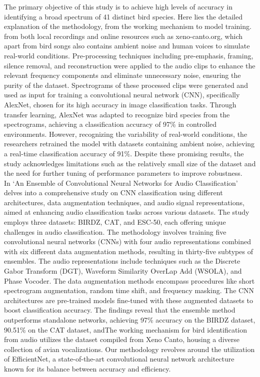 The primary objective of this study is to achieve high levels of accuracy in identifying a broad spectrum of 41 distinct bird species. 
Here lies the detailed explanation of the methodology, from the working mechanism to model training.
from both local recordings and
online resources such as xeno-canto.org, which apart from bird songs also
contains ambient noise and
human voices to simulate real-world conditions. Pre-processing techniques
including pre-emphasis, framing, silence removal, and reconstruction were
applied to the audio clips to enhance the relevant frequency components and
eliminate unnecessary noise, ensuring the purity of the dataset. Spectrograms
of these processed clips were generated and used as input for training a
convolutional neural network (CNN), specifically AlexNet, chosen for its high
accuracy in image classification tasks. Through transfer learning, AlexNet was
adapted to recognize bird species from the spectrograms, achieving a
classification accuracy of 97\% in controlled environments. However,
recognizing the variability of real-world conditions, the researchers retrained
the model with datasets containing ambient noise, achieving a real-time
classification accuracy of 91\%. Despite these promising results, the study
acknowledges limitations such as the relatively small size of the dataset and
the need for further tuning of performance parameters to improve
robustness.\\

In\cite{nanni2021ensemble} `An Ensemble of Convolutional Neural Networks for Audio
Classification' delves into a comprehensive study on CNN classification using
different architectures, data augmentation techniques, and audio signal
representations, aimed at enhancing audio classification tasks across various
datasets. The study employs three datasets: BIRDZ, CAT, and ESC-50, each
offering unique challenges in audio classification. The methodology involves
training five convolutional neural networks (CNNs) with four audio
representations combined with six different data augmentation methods,
resulting in thirty-five subtypes of ensembles. The audio representations
include techniques such as the Discrete Gabor Transform (DGT), Waveform
Similarity OverLap Add (WSOLA), and Phase Vocoder. The data augmentation
methods encompass procedures like short spectrogram augmentation, random time
shift, and frequency masking. The CNN architectures are pre-trained models
fine-tuned with these augmented datasets to boost classification accuracy. The
findings reveal that the ensemble method outperforms standalone networks,
achieving 97\% accuracy on the BIRDZ dataset, 90.51\% on the CAT dataset, andThe working mechanism for bird identification from audio utilizes the dataset compiled from Xeno Canto, housing a diverse collection of avian vocalizations. 
Our methodology revolves around the utilization of EfficientNet, a state-of-the-art convolutional neural network architecture known for 
its balance between accuracy and efficiency.

